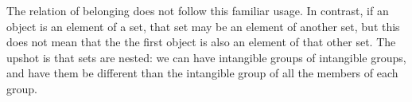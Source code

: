 The relation of belonging does not follow this familiar usage.
In contrast, if an object is an element of a set, that set may be an element of another set, but this does not mean that the the first object is also an element of that other set.
The upshot is that sets are nested: we can have intangible groups of intangible groups, and have them be different than the intangible group of all the members of each group.



%
%

%
%


